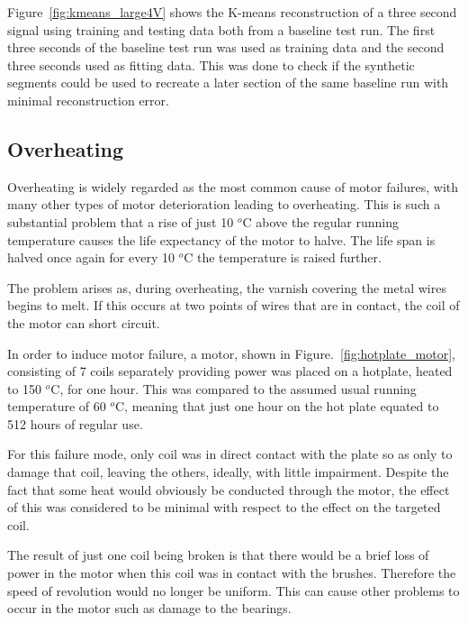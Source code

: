 Figure~\ref{fig:kmeans_large4V} shows the K-means reconstruction of a three second signal using training and testing data both from a baseline test run. The first three seconds of the baseline test run was used as training data and the second three seconds used as fitting data. This was done to check if the synthetic segments could be used to recreate a later section of the same baseline run with minimal reconstruction error. 

\subsection{Overheating}
Overheating is widely regarded as the most common cause of motor failures, with many other types of motor deterioration leading to overheating. This is such a substantial problem that a rise of just 10 $^o$C above the regular running temperature causes the life expectancy of the motor to halve. The life span is halved once again for every 10 $^o$C the temperature is raised further.

The problem arises as, during overheating, the varnish covering the metal wires begins to melt. If this occurs at two points of wires that are in contact, the coil of the motor can short circuit.


In order to induce motor failure, a motor, shown in Figure.~\ref{fig:hotplate_motor}, consisting of 7 coils separately providing power was placed on a hotplate, heated to 150 $^o$C, for one hour. This was compared to the assumed usual running temperature of 60 $^o$C, meaning that just one hour on the hot plate equated to 512 hours of regular use.

For this failure mode, only coil was in direct contact with the plate so as only to damage that coil, leaving the others, ideally, with little impairment. Despite the fact that some heat would obviously be conducted through the motor, the effect of this was considered to be minimal with respect to the effect on the targeted coil.

The result of just one coil being broken is that there would be a brief loss of power in the motor when this coil was in contact with the brushes. %
Therefore the speed of revolution would no longer be uniform. This can cause other problems to occur in the motor such as damage to the bearings.

